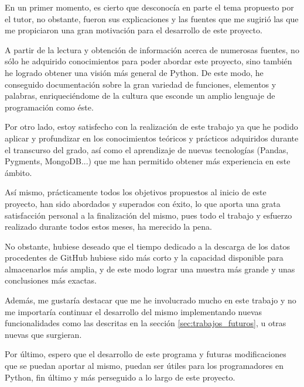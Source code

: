 \documentclass[a4paper, 12pt]{book}
\begin{document}
En un primer momento, es cierto que desconocía en parte el tema propuesto por el tutor, no obstante, fueron sus explicaciones y las fuentes que me sugirió las que me propiciaron una gran motivación para el desarrollo de este proyecto.

A partir de la lectura y obtención de información acerca de numerosas fuentes, no sólo he adquirido conocimientos para poder abordar este proyecto, sino también he logrado obtener una visión más general de Python. De este modo, he conseguido documentación sobre la gran variedad de funciones, elementos y palabras, enriqueciéndome de la cultura que esconde un amplio lenguaje de programación como éste.

Por otro lado, estoy satisfecho con la realización de este trabajo ya que he podido aplicar y profundizar en los conocimientos teóricos y prácticos adquiridos durante el transcurso del grado, así como el aprendizaje de nuevas tecnologías (Pandas, Pygments, MongoDB...) que me han permitido obtener más experiencia en este ámbito.

Así mismo, prácticamente todos los objetivos propuestos al inicio de este proyecto, han sido abordados y superados con éxito, lo que aporta una grata satisfacción personal a la finalización del mismo, pues todo el trabajo y esfuerzo realizado durante todos estos meses, ha merecido la pena.

No obstante, hubiese deseado que el tiempo dedicado a la descarga de los datos procedentes de GitHub hubiese sido más corto y la capacidad disponible para almacenarlos más amplia, y de este modo lograr una muestra más grande y unas conclusiones más exactas.

Además, me gustaría destacar que me he involucrado mucho en este trabajo y no me importaría continuar el desarrollo del mismo implementando nuevas funcionalidades como las descritas en la sección \ref{sec:trabajos_futuros}, u otras nuevas que surgieran.

Por último, espero que el desarrollo de este programa y futuras modificaciones que se puedan aportar al mismo, puedan ser útiles para los programadores en Python, fin último y más perseguido a lo largo de este proyecto.



\cleardoublepage
\appendix
\end{document}
